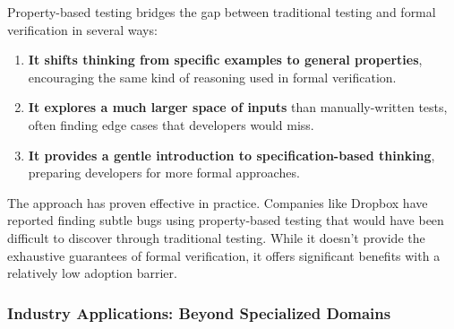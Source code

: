 \documentclass[11pt]{article}
\begin{document}
\begin{enumerate}
Property-based testing bridges the gap between traditional testing and formal verification in several ways:

\begin{enumerate}
\item \textbf{It shifts thinking from specific examples to general properties}, encouraging the same kind of reasoning used in formal verification.

\item \textbf{It explores a much larger space of inputs} than manually-written tests, often finding edge cases that developers would miss.

\item \textbf{It provides a gentle introduction to specification-based thinking}, preparing developers for more formal approaches.
\end{enumerate}

The approach has proven effective in practice. Companies like Dropbox have reported finding subtle bugs using property-based testing that would have been difficult to discover through traditional testing. While it doesn't provide the exhaustive guarantees of formal verification, it offers significant benefits with a relatively low adoption barrier.
\end{enumerate}
\subsubsection{Industry Applications: Beyond Specialized Domains}
\label{sec:orgcdc4291}
\end{document}
